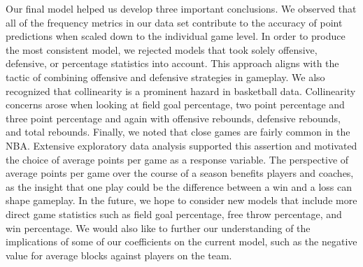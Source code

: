 \documentclass[
]{article}
\begin{document}
Our final model helped us develop three important conclusions. We
observed that all of the frequency metrics in our data set contribute to
the accuracy of point predictions when scaled down to the individual
game level. In order to produce the most consistent model, we rejected
models that took solely offensive, defensive, or percentage statistics
into account. This approach aligns with the tactic of combining
offensive and defensive strategies in gameplay. We also recognized that
collinearity is a prominent hazard in basketball data. Collinearity
concerns arose when looking at field goal percentage, two point
percentage and three point percentage and again with offensive rebounds,
defensive rebounds, and total rebounds. Finally, we noted that close
games are fairly common in the NBA. Extensive exploratory data analysis
supported this assertion and motivated the choice of average points per
game as a response variable. The perspective of average points per game
over the course of a season benefits players and coaches, as the insight
that one play could be the difference between a win and a loss can shape
gameplay. In the future, we hope to consider new models that include
more direct game statistics such as field goal percentage, free throw
percentage, and win percentage. We would also like to further our
understanding of the implications of some of our coefficients on the
current model, such as the negative value for average blocks against
players on the team.
\end{document}
